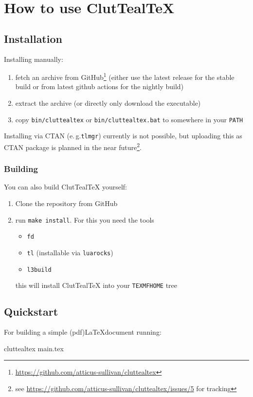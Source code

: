 \documentclass[a4paper, 11pt]{scrartcl}
\newcommand\eg{e.\,g.\xspace}
\let\TeXold\TeX
\newcommand\CluttealTeX{ClutTeal\TeX\xspace}
\renewcommand\TeX{\TeXold\xspace}
\begin{document}
\section{How to use \CluttealTeX}
\subsection{Installation}
Installing manually:
\begin{enumerate}
	\renewcommand{\theenumi}{\arabic{enumi}}
	\item fetch an archive from GitHub\footnote{\url{https://github.com/atticus-sullivan/cluttealtex}}
		(either use the latest release for the stable build or from latest github actions for the nightly build)
	\item extract the archive (or directly only download the executable)
	\item copy \texttt{bin/cluttealtex} or \texttt{bin/cluttealtex.bat} to somewhere in your \texttt{PATH}
\end{enumerate}

Installing via CTAN (\eg \texttt{tlmgr}) currently is not possible, but uploading this as CTAN package is planned in the near future\footnote{see \url{https://github.com/atticus-sullivan/cluttealtex/issues/5} for tracking}.

\subsubsection{Building}
You can also build \CluttealTeX yourself:
\begin{enumerate}
	\renewcommand{\theenumi}{\arabic{enumi}}
	\item Clone the repository from GitHub
	\item run \texttt{make install}. For this you need the tools
		\begin{itemize}
			\item \texttt{fd}
			\item \texttt{tl} (installable via \texttt{luarocks})
			\item \texttt{l3build}
		\end{itemize}
		this will install \CluttealTeX into your \texttt{TEXMFHOME} tree
\end{enumerate}

\subsection{Quickstart}
For building a simple (pdf)\LaTeX document running:
\begin{boxcode}[none][\normalsize]
  cluttealtex main.tex
\end{boxcode}
\end{document}
